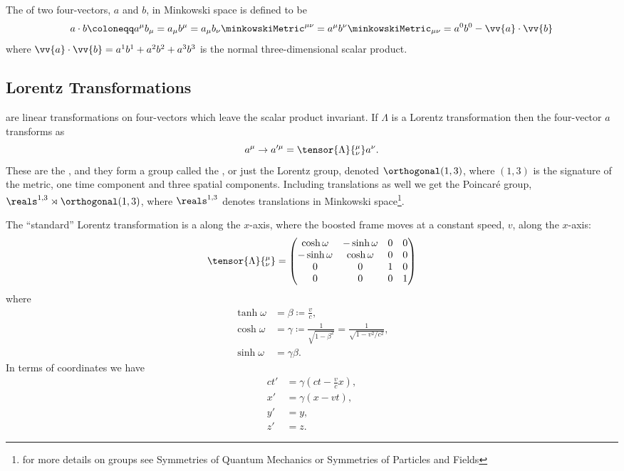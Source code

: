 The  of two four-vectors, \(a\) and \(b\), in Minkowski space is defined to be
\begin{equation}
    a \cdot b \coloneqq a^\mu b_\mu = a_\mu b^\mu = a_\mu b_\nu \minkowskiMetric^{\mu\nu} = a^\mu b^\nu \minkowskiMetric_{\mu\nu} = a^0b^0 - \vv{a} \cdot \vv{b}
\end{equation}
where \(\vv{a} \cdot \vv{b} = a^1b^1 + a^2b^2 + a^3b^3\) is the normal three-dimensional scalar product.

\subsection{Lorentz Transformations}
 are linear transformations on four-vectors which leave the scalar product invariant.
If \(\Lambda\) is a Lorentz transformation then the four-vector \(a\) transforms as
\begin{equation}
    a^\mu \to a'^\mu = \tensor{\Lambda}{^\mu_\nu} a^\nu.
\end{equation}
These are the , and they form a group called the , or just the Lorentz group, denoted \(\orthogonal(1, 3)\), where \((1,3)\) is the signature of the metric, one time component and three spatial components.
Including translations as well we get the Poincar\'e group, \(\reals^{1,3} \rtimes \orthogonal(1, 3)\), where \(\reals^{1,3}\) denotes translations in Minkowski space\footnote{for more details on groups see Symmetries of Quantum Mechanics or Symmetries of Particles and Fields}.

The \enquote{standard} Lorentz transformation is a  along the \(x\)-axis, where the boosted frame moves at a constant speed, \(v\), along the \(x\)-axis:
\begin{equation}
    \tensor{\Lambda}{^\mu_\nu} = 
    \begin{pmatrix}
        \cosh \omega & -\sinh \omega & 0 & 0\\
        -\sinh \omega & \cosh \omega & 0 & 0\\
        0 & 0 & 1 & 0\\
        0 & 0 & 0 & 1
    \end{pmatrix}
\end{equation}
where
\begin{align}
    \tanh \omega &= \beta \coloneqq \frac{v}{c},\\
    \cosh \omega &= \gamma \coloneqq \frac{1}{\sqrt{1 - \beta^2}} = \frac{1}{\sqrt{1 - v^2/c^2}},\\
    \sinh \omega &= \gamma\beta.
\end{align}
In terms of coordinates we have
\begin{align}
    ct' &= \gamma\left( ct -  \frac{v}{c}x \right),\\
    x' &= \gamma(x - vt),\\
    y' &= y,\\
    z' &= z.
\end{align}

